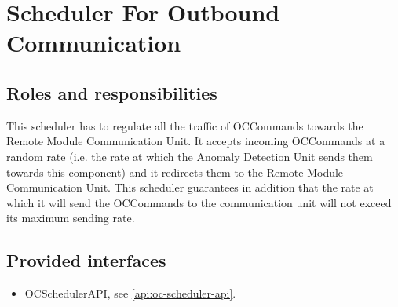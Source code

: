 \section{Scheduler For Outbound Communication}
\label{element:scheduler-oc}

\subsection{Roles and responsibilities}

\npar This scheduler has to regulate all the traffic of OCCommands towards the
Remote Module Communication Unit. It accepts incoming OCCommands at a random
rate (i.e. the rate at which the Anomaly Detection Unit sends them towards this
component) and it redirects them to the Remote Module Communication Unit. This
scheduler guarantees in addition that the rate at which it will send the
OCCommands to the communication unit will not exceed its maximum
sending rate.

\subsection{Provided interfaces}

\begin{itemize}
  \item OCSchedulerAPI, see \ref{api:oc-scheduler-api}.
\end{itemize}
